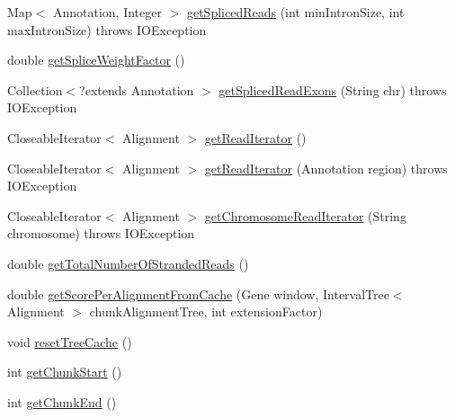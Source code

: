 \begin{DoxyCompactItemize}
Map$<$ Annotation, Integer $>$ \hyperlink{interfacebroad_1_1pda_1_1seq_1_1segmentation_1_1_alignment_data_model_a2ad17370a85c1df1409c31fc3d637370}{get\+Spliced\+Reads} (int min\+Intron\+Size, int max\+Intron\+Size)  throws I\+O\+Exception
\item 
double \hyperlink{interfacebroad_1_1pda_1_1seq_1_1segmentation_1_1_alignment_data_model_a06594535ec2d118a84a9a10a0755d7fa}{get\+Splice\+Weight\+Factor} ()
\item 
Collection$<$?extends Annotation $>$ \hyperlink{interfacebroad_1_1pda_1_1seq_1_1segmentation_1_1_alignment_data_model_a5b3f5ae924195f85e3867fafcf12925a}{get\+Spliced\+Read\+Exons} (String chr)  throws I\+O\+Exception
\item 
Closeable\+Iterator$<$ Alignment $>$ \hyperlink{interfacebroad_1_1pda_1_1seq_1_1segmentation_1_1_alignment_data_model_a75ba7890f0790daab9f6b1d0002afe47}{get\+Read\+Iterator} ()
\item 
Closeable\+Iterator$<$ Alignment $>$ \hyperlink{interfacebroad_1_1pda_1_1seq_1_1segmentation_1_1_alignment_data_model_acc6162ee6b18c5abdc5a8a83c0f6ad56}{get\+Read\+Iterator} (Annotation region)  throws I\+O\+Exception
\item 
Closeable\+Iterator$<$ Alignment $>$ \hyperlink{interfacebroad_1_1pda_1_1seq_1_1segmentation_1_1_alignment_data_model_a708fef9e7fe5b4b9fdb00b8f78885677}{get\+Chromosome\+Read\+Iterator} (String chromosome)  throws I\+O\+Exception
\item 
double \hyperlink{interfacebroad_1_1pda_1_1seq_1_1segmentation_1_1_alignment_data_model_a8735fdbc1316cf8f2612b1ee23242ed6}{get\+Total\+Number\+Of\+Stranded\+Reads} ()
\item 
double \hyperlink{interfacebroad_1_1pda_1_1seq_1_1segmentation_1_1_alignment_data_model_a60519992f1a090084dda7052debef056}{get\+Score\+Per\+Alignment\+From\+Cache} (Gene window, Interval\+Tree$<$ Alignment $>$ chunk\+Alignment\+Tree, int extension\+Factor)
\item 
void \hyperlink{interfacebroad_1_1pda_1_1seq_1_1segmentation_1_1_alignment_data_model_a5433aba901b583c3c7316e0fa87046e0}{reset\+Tree\+Cache} ()
\item 
int \hyperlink{interfacebroad_1_1pda_1_1seq_1_1segmentation_1_1_alignment_data_model_ac0d7d4cd9a3c4a866c3e6cdad9f60992}{get\+Chunk\+Start} ()
\item 
int \hyperlink{interfacebroad_1_1pda_1_1seq_1_1segmentation_1_1_alignment_data_model_a95d31d5d49223e148254478e9961effb}{get\+Chunk\+End} ()
\item 

\end{DoxyCompactItemize}
